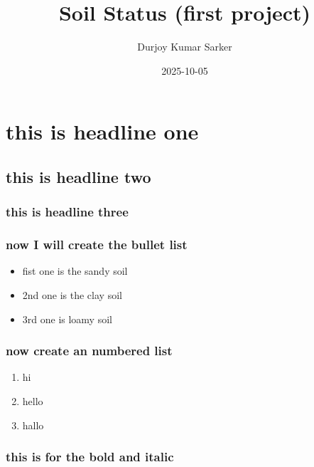 \documentclass[
]{article}
\title{Soil Status (first project)}
\author{Durjoy Kumar Sarker}
\date{2025-10-05}
\providecommand{\tightlist}{%
  \setlength{\itemsep}{0pt}\setlength{\parskip}{0pt}}
\begin{document}
\maketitle

\section{this is headline one}\label{this-is-headline-one}

\subsection{this is headline two}\label{this-is-headline-two}

\subsubsection{this is headline three}\label{this-is-headline-three}

\subsubsection{now I will create the bullet
list}\label{now-i-will-create-the-bullet-list}

\begin{itemize}
\tightlist
\item
  fist one is the sandy soil
\item
  2nd one is the clay soil
\item
  3rd one is loamy soil
\end{itemize}

\subsubsection{now create an numbered
list}\label{now-create-an-numbered-list}

\begin{enumerate}
\def\labelenumi{\arabic{enumi}.}
\tightlist
\item
  hi
\item
  hello
\item
  hallo
\end{enumerate}

\subsubsection{this is for the bold and
italic}\label{this-is-for-the-bold-and-italic}
\end{document}

